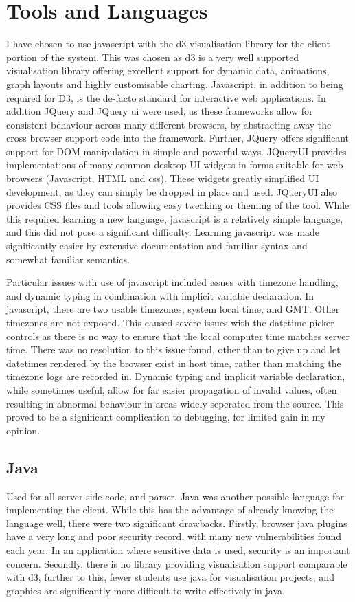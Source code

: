\chapter{Tools and Languages}\label{langs}

I have chosen to use javascript with the d3 visualisation library \cite{bostock2011d3} for the client portion of the system. This was chosen as d3 is a very well supported visualisation library offering excellent support for dynamic data, animations, graph layouts and highly customisable charting. Javascript, in addition to being required for D3, is the de-facto standard for interactive web applications. 
In addition JQuery and JQuery ui were used, as these frameworks allow for consistent behaviour across many different browsers, by abstracting away the cross browser support code into the framework. Further, JQuery offers significant support for DOM manipulation in simple and powerful ways. JQueryUI provides implementations of many common desktop UI widgets in forms suitable for web browsers (Javascript, HTML and css). These widgets greatly simplified UI development, as they can simply be dropped in place and used. JQueryUI also provides CSS files and tools allowing easy tweaking or theming of the tool.
While this required learning a new language, javascript is a relatively simple language, and this did not pose a significant difficulty. Learning javascript was made significantly easier by extensive documentation and familiar syntax and somewhat familiar semantics. 

Particular issues with use of javascript included issues with timezone handling, and dynamic typing in combination with implicit variable declaration. In javascript, there are two usable timezones, system local time, and GMT. Other timezones are not exposed. This caused severe issues with the datetime picker controls as there is no way to ensure that the local computer time matches server time. There was no resolution to this issue found, other than to give up and let datetimes rendered by the browser exist in host time, rather than matching the timezone logs are recorded in. 
Dynamic typing and implicit variable declaration, while sometimes useful, allow for far easier propagation of invalid values, often resulting in abnormal behaviour in areas widely seperated from the source. This proved to be a significant complication to debugging, for limited gain in my opinion. 

\section{Java}
Used for all server side code, and parser. 
Java was another possible language for implementing the client. While this has the advantage of already knowing the language well, there were two significant drawbacks. Firstly, browser java plugins have a very long and poor security record, with many new vulnerabilities found each year. In an application where sensitive data is used, security is an important concern. Secondly, there is no library providing visualisation support comparable with d3, further to this, fewer students use java for visualisation projects, and graphics are significantly more difficult to write effectively in java. 

